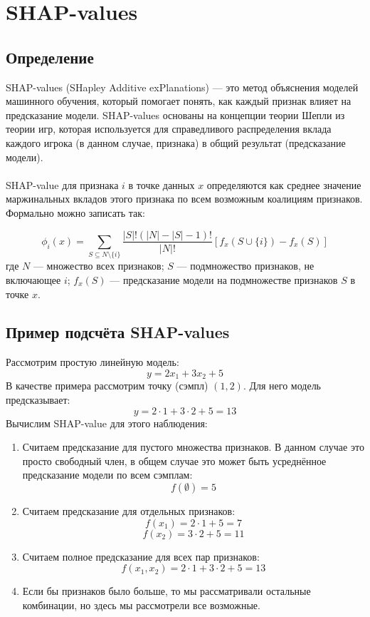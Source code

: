 \section*{SHAP-values}

\subsection*{Определение}
SHAP-values (SHapley Additive exPlanations) — это метод объяснения моделей машинного обучения, который помогает понять, как каждый признак влияет на предсказание модели. SHAP-values основаны на концепции теории Шепли из теории игр, которая используется для справедливого распределения вклада каждого игрока (в данном случае, признака) в общий результат (предсказание модели).\\\\
SHAP-value для признака $i$ в точке данных $x$ определяются как среднее значение маржинальных вкладов этого признака по всем возможным коалициям признаков. Формально можно записать так:

\[ \phi_i(x) = \sum_{S \subseteq N \setminus \{i\}} \frac{|S|!(|N|-|S|-1)!}{|N|!} [f_x(S \cup \{i\}) - f_x(S)] \]
где $N$ — множество всех признаков; $S$ — подмножество признаков, не включающее $i$; $f_x(S)$ — предсказание модели на подмножестве признаков $S$ в точке $x$.

\subsection*{Пример подсчёта SHAP-values}
Рассмотрим простую линейную модель:
$$ y = 2x_1 + 3x_2 + 5 $$
В качестве примера рассмотрим точку (сэмпл) $(1, 2)$. Для него модель предсказывает:
$$ y = 2 \cdot 1 + 3 \cdot 2 + 5 = 13 $$
Вычислим SHAP-value для этого наблюдения:
\begin{enumerate}
    \item Считаем предсказание для пустого множества признаков. В данном случае это просто свободный член, в общем случае это может быть усреднённое предсказание модели по всем сэмплам:
        $$ f(\emptyset) = 5 $$

    \item Считаем предсказание для отдельных признаков:
        $$ f(x_1) = 2 \cdot 1 + 5 = 7 $$
        $$ f(x_2) = 3 \cdot 2 + 5 = 11 $$

    \item Считаем полное предсказание для всех пар признаков:  
        $$ f(x_1, x_2) = 2 \cdot 1 + 3 \cdot 2 + 5 = 13 $$

    \item Если бы признаков было больше, то мы рассматривали остальные комбинации, но здесь мы рассмотрели все возможные.
\end{enumerate}

